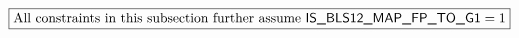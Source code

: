 \[
	\boxed{\text{All constraints in this subsection further assume } \textsf{IS\_BLS12\_MAP\_FP\_TO\_G1} = 1}
\]